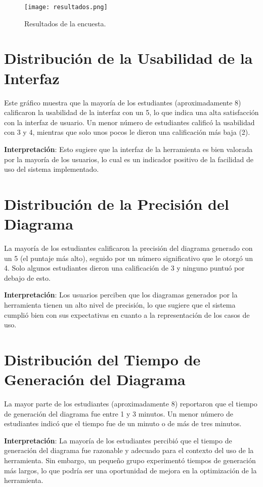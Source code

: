  \begin{figure}[H]  
	\centering
	\texttt{[image: resultados.png]} 
	\caption{Resultados de la encuesta.}
	\label{fig:cap4_resultados}
\end{figure}

\section{Distribución de la Usabilidad de la Interfaz}

Este gráfico muestra que la mayoría de los estudiantes (aproximadamente 8) calificaron la usabilidad de la interfaz con un 5, lo que indica una alta satisfacción con la interfaz de usuario. Un menor número de estudiantes calificó la usabilidad con 3 y 4, mientras que solo unos pocos le dieron una calificación más baja (2).

\textbf{Interpretación}: Esto sugiere que la interfaz de la herramienta es bien valorada por la mayoría de los usuarios, lo cual es un indicador positivo de la facilidad de uso del sistema implementado.

\section{Distribución de la Precisión del Diagrama}

La mayoría de los estudiantes calificaron la precisión del diagrama generado con un 5 (el puntaje más alto), seguido por un número significativo que le otorgó un 4. Solo algunos estudiantes dieron una calificación de 3 y ninguno puntuó por debajo de esto.

\textbf{Interpretación}: Los usuarios perciben que los diagramas generados por la herramienta tienen un alto nivel de precisión, lo que sugiere que el sistema cumplió bien con sus expectativas en cuanto a la representación de los casos de uso.

\section{Distribución del Tiempo de Generación del Diagrama}

La mayor parte de los estudiantes (aproximadamente 8) reportaron que el tiempo de generación del diagrama fue entre 1 y 3 minutos. Un menor número de estudiantes indicó que el tiempo fue de un minuto o de más de tres minutos.

\textbf{Interpretación}: La mayoría de los estudiantes percibió que el tiempo de generación del diagrama fue razonable y adecuado para el contexto del uso de la herramienta. Sin embargo, un pequeño grupo experimentó tiempos de generación más largos, lo que podría ser una oportunidad de mejora en la optimización de la herramienta.

